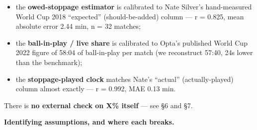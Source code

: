 \documentclass[
]{article}
\providecommand{\tightlist}{%
  \setlength{\itemsep}{0pt}\setlength{\parskip}{0pt}}
\begin{document}
\begin{itemize}
\tightlist
\item
  the \textbf{owed-stoppage estimator} is calibrated to Nate Silver's
  hand-measured World Cup 2018 ``expected'' (should-be-added) column ---
  r = 0.825, mean absolute error 2.44 min, n = 32 matches;
\item
  the \textbf{ball-in-play / live share} is calibrated to Opta's
  published World Cup 2022 figure of 58:04 of ball-in-play per match (we
  reconstruct 57:40, 24s lower than the benchmark);
\item
  the \textbf{stoppage-played clock} matches Nate's ``actual''
  (actually-played) column almost exactly --- r = 0.992, MAE 0.13 min.
\end{itemize}

There is \textbf{no external check on X\% itself} --- see §6 and §7.

\textbf{Identifying assumptions, and where each breaks.}
\end{document}
